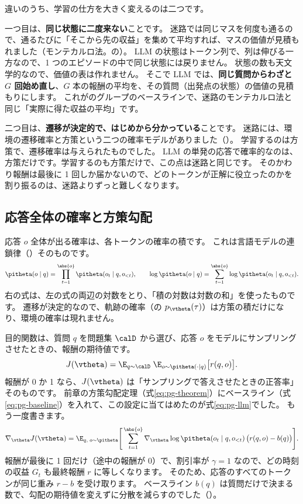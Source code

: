 違いのうち、学習の仕方を大きく変えるのは二つです。

一つ目は、\textbf{同じ状態に二度来ない}ことです。
迷路では同じマスを何度も通るので、通るたびに「そこから先の収益」を集めて平均すれば、マスの価値が見積もれました（モンテカルロ法。の）。
LLM の状態はトークン列で、列は伸びる一方なので、1 つのエピソードの中で同じ状態には戻りません。
状態の数も天文学的なので、価値の表は作れません。
そこで LLM では、\textbf{同じ質問からわざと $G$ 回始め直し}、$G$ 本の報酬の平均を、その質問（出発点の状態）の価値の見積もりにします。
これがのグループのベースラインで、迷路のモンテカルロ法と同じ「実際に得た収益の平均」です。

二つ目は、\textbf{遷移が決定的で、はじめから分かっている}ことです。
迷路には、環境の遷移確率と方策という二つの確率モデルがありました（）。
学習するのは方策で、遷移確率は与えられたものでした。
LLM の単発の応答で確率的なのは、方策だけです。学習するのも方策だけで、この点は迷路と同じです。
そのかわり報酬は最後に 1 回しか届かないので、どのトークンが正解に役立ったのかを割り振るのは、迷路よりずっと難しくなります。

\subsection{応答全体の確率と方策勾配}

応答 $o$ 全体が出る確率は、各トークンの確率の積です。
これは言語モデルの連鎖律（）そのものです。
\begin{equation}
\pitheta(o\mid q)=\prod_{t=1}^{\abs{o}}\pitheta(o_t\mid q,o_{<t}),
\qquad
\log\pitheta(o\mid q)=\sum_{t=1}^{\abs{o}}\log\pitheta(o_t\mid q,o_{<t}).
\label{eq:rl-seq-prob}
\end{equation}
右の式は、左の式の両辺の対数をとり、「積の対数は対数の和」を使ったものです。
遷移が決定的なので、軌跡の確率（の $p_{\vtheta}(\tau)$）は方策の積だけになり、環境の確率は現れません。

目的関数は、質問 $q$ を問題集 $\calD$ から選び、応答 $o$ をモデルにサンプリングさせたときの、報酬の期待値です。
\begin{equation}
J(\vtheta)=\E_{q\sim\calD}\;\E_{o\sim\pitheta(\cdot\mid q)}\bigl[r(q,o)\bigr].
\label{eq:rl-objective}
\end{equation}
報酬が 0 か 1 なら、$J(\vtheta)$ は「サンプリングで答えさせたときの正答率」そのものです。
前章の方策勾配定理（式\eqref{eq:pg-theorem}）にベースライン（式\eqref{eq:pg-baseline}）を入れて、この設定に当てはめたのが式\eqref{eq:pg-llm}でした。
もう一度書きます。
\begin{equation}
\nabla_{\vtheta}J(\vtheta)
=\E_{q,\;o\sim\pitheta}\Biggl[\,\sum_{t=1}^{\abs{o}}\nabla_{\vtheta}\log\pitheta(o_t\mid q,o_{<t})\,\bigl(r(q,o)-b(q)\bigr)\Biggr].
\label{eq:rl-pg}
\end{equation}
報酬が最後に 1 回だけ（途中の報酬が 0）で、割引率が $\gamma=1$ なので、どの時刻の収益 $G_t$ も最終報酬 $r$ に等しくなります。
そのため、応答のすべてのトークンが同じ重み $r-b$ を受け取ります。
ベースライン $b(q)$ は質問だけで決まる数で、勾配の期待値を変えずに分散を減らすのでした（）。


